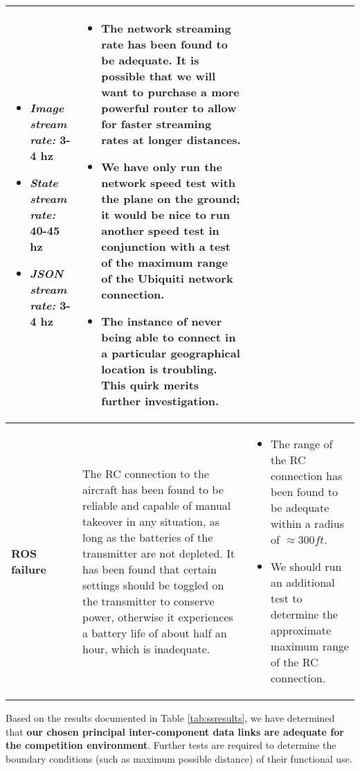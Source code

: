 \documentclass[]{auvsi_doc}
\begin{document}
\begin{center}
\begin{longtable}[H]{|P{3cm}|P{5.75cm}|P{5.75cm}|}
\begin{itemize}
			\item \textit{Image stream rate:} 3-4 hz
			\item \textit{State stream rate:} 40-45 hz
			\item \textit{JSON stream rate:} 3-4 hz
		\end{itemize} &	\begin{itemize}
		\item The network streaming rate has been found to be adequate. It is possible that we will want to purchase a more powerful router to allow for faster streaming rates at longer distances.
		\item We have only run the network speed test with the plane on the ground; it would be nice to run another speed test in conjunction with a test of the maximum range of the Ubiquiti network connection.
		\item The instance of never being able to connect in a particular geographical location is troubling. This quirk merits further investigation.
	\end{itemize} \\
		\hline
		\textbf{ROS failure}	& The RC connection to the aircraft has been found to be reliable and capable of manual takeover in any situation, as long as the batteries of the transmitter are not depleted. It has been found that certain settings should be toggled on the transmitter to conserve power, otherwise it experiences a battery life of about half an hour, which is inadequate. & \begin{itemize}
			\item The range of the RC connection has been found to be adequate within a radius of $\approx 300ft$.
			\item We should run an additional test to determine the approximate maximum range of the RC connection.
		\end{itemize} \\
		\hline
	\end{longtable}
\end{center}

Based on the results documented in Table \ref{tab:ssresults}, we have determined that \textbf{our chosen principal inter-component data links are adequate for the competition environment}. Further tests are required to determine the boundary conditions (such as maximum possible distance) of their functional use.
\end{document}
